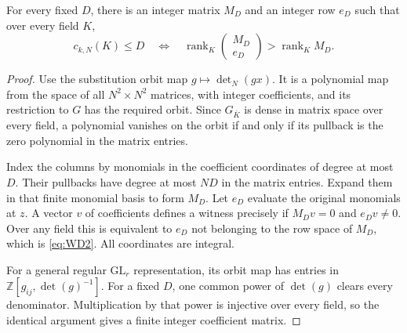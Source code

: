 \begin{lemma}
For every fixed $D$, there is an integer matrix $M_D$ and an integer row
$e_D$ such that over every field $K$,
\begin{equation}
 c_{k,N}(K)\le D
 \quad\Longleftrightarrow\quad
 \operatorname{rank}_K\begin{pmatrix}M_D\\e_D\end{pmatrix}
 >\operatorname{rank}_K M_D.
\label{eq:WD2}
\end{equation}
\end{lemma}
\begin{proof}
Use the substitution orbit map $g\mapsto\det_N(gx)$.  It is a
polynomial map from the space of all $N^2\times N^2$ matrices, with
integer coefficients, and its restriction to $G$ has the required
orbit.  Since $G_{\overline K}$ is dense in matrix space over every
field, a polynomial vanishes on the orbit if and only if its pullback
is the zero polynomial in the matrix entries.

Index the columns by monomials in the coefficient coordinates of degree
at most $D$.  Their pullbacks have degree at most $ND$ in the matrix
entries.  Expand them in that finite monomial basis to form $M_D$.
Let $e_D$ evaluate the original monomials at $z$.  A vector $v$ of
coefficients defines a witness precisely if $M_Dv=0$ and $e_Dv\ne0$.
Over any field this is equivalent to $e_D$ not belonging to the row
space of $M_D$, which is \eqref{eq:WD2}.  All coordinates are integral.

For a general regular $\mathrm{GL}_r$ representation, its orbit map
has entries in $\mathbb Z[g_{ij},\det(g)^{-1}]$.  For a fixed $D$,
one common power of $\det(g)$ clears every denominator.  Multiplication
by that power is injective over every field, so the identical argument
gives a finite integer coefficient matrix.
\end{proof}

